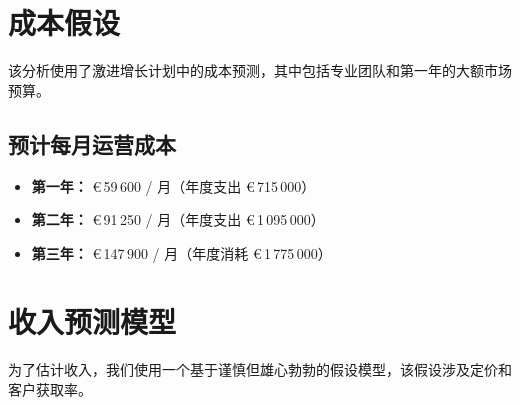 \documentclass[11pt, a4paper, oneside]{article}
\begin{document}
\section{成本假设}
该分析使用了激进增长计划中的成本预测，其中包括专业团队和第一年的大额市场预算。

\subsection*{预计每月运营成本}
\begin{itemize}
  \item \textbf{第一年：} \euro{}\,59\,600 / 月（年度支出 \euro{}\,715\,000）
  \item \textbf{第二年：} \euro{}\,91\,250 / 月（年度支出 \euro{}\,1\,095\,000）



\item \textbf{第三年：} \euro{}\,147\,900 / 月（年度消耗 \euro{}\,1\,775\,000）
\end{itemize}

\section{收入预测模型}
为了估计收入，我们使用一个基于谨慎但雄心勃勃的假设模型，该假设涉及定价和客户获取率。
\end{document}

